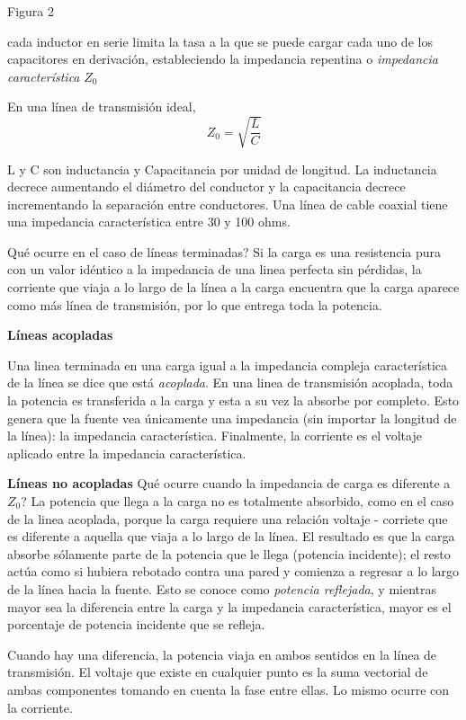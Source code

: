 \documentclass[12pt,letterpaper,titlepage,twoside]{book}
\begin{document}
Figura 2 

cada inductor en serie limita la tasa a la que se puede cargar cada uno de los capacitores en derivación, estableciendo la impedancia repentina o \emph{impedancia característica} $Z_0$

En una línea de transmisión ideal, 
\begin{equation}
Z_0 = \sqrt{\frac{L}{C}}
\end{equation}

L y C son inductancia y Capacitancia por unidad de longitud. La inductancia decrece aumentando el diámetro del conductor y la capacitancia decrece incrementando la separación entre conductores. 
Una línea de cable coaxial tiene una impedancia característica entre 30 y 100 ohms.

Qué ocurre en el caso de líneas terminadas?
Si la carga es una resistencia pura con un valor idéntico a la impedancia de una linea perfecta sin pérdidas, la corriente que viaja a lo largo de la línea a  la carga encuentra que la carga aparece como más línea de transmisión, por lo que entrega toda la potencia.

\textbf{Líneas acopladas}

Una linea terminada en una carga igual a la impedancia compleja característica de la línea se dice que está \emph{acoplada}. En una linea de transmisión acoplada, toda la potencia es transferida a la carga y esta a su vez la absorbe por completo. Esto genera que la fuente vea únicamente una impedancia (sin importar la longitud de la línea): la impedancia característica. Finalmente, la corriente es el voltaje aplicado entre la impedancia característica.

\textbf{Líneas no acopladas}
Qué ocurre cuando la impedancia de carga es diferente a $Z_0$? 
La potencia que llega a la carga no es totalmente absorbido, como en el caso de la linea acoplada, porque la carga requiere una relación voltaje - corriete que es diferente a aquella que viaja a lo largo de la línea. El resultado es que la carga absorbe sólamente parte de la potencia que le llega (potencia incidente); el resto actúa como si hubiera rebotado contra una pared y comienza a regresar a lo largo de la línea hacia la fuente. Esto se conoce como \emph{potencia reflejada}, y mientras mayor sea la diferencia entre la carga y la impedancia característica, mayor es el porcentaje de potencia incidente que se refleja.

Cuando hay una diferencia, la potencia viaja en ambos sentidos en la línea de transmisión. El voltaje que existe en cualquier punto es la suma vectorial de ambas componentes tomando en cuenta la fase entre ellas. Lo mismo ocurre con la corriente.
\end{document}
